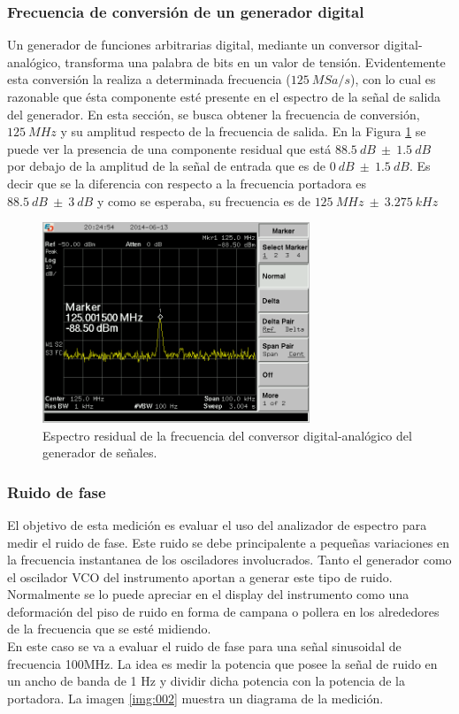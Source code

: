 \documentclass[a4paper,10pt]{article}
\begin{document}
		\subsubsection{Frecuencia de conversi\'on de un generador digital}
		\indent Un generador de funciones arbitrarias digital, mediante un 
		conversor digital-anal\'ogico, transforma una palabra de bits en un 
		valor de tensi\'on. Evidentemente esta conversi\'on la realiza a 
		determinada frecuencia ($125~MSa/s$), con lo cual es razonable que 
		\'esta componente est\'e presente en el espectro de la se\~nal de salida
		del generador. En esta secci\'on, se busca obtener la frecuencia de 
		conversi\'on, $125~MHz$ y su amplitud respecto de la frecuencia de 
		salida. En la Figura \ref{freqres} se puede ver la presencia de una 
		componente residual que est\'a $88.5~dB~\pm~1.5~dB$ por debajo de la 
		amplitud de la se\~nal de entrada que es de $0~dB~\pm~1.5~dB$. Es decir 
		que se la diferencia con respecto a la frecuencia portadora es 
		$88.5~dB~\pm~3~dB$ y como se esperaba, su frecuencia es de 
		$125~MHz~\pm~3.275~kHz$
		
		\begin{figure}[!htb]
				\centering
				\includegraphics[width=8cm]
				{Imagenes/SCREN448.png}
				\caption{Espectro residual de la frecuencia del conversor 
				digital-anal\'ogico del generador de se\~nales.}
				\label{freqres} 
		\end{figure}
		
		\subsubsection{Ruido de fase}
		\indent El objetivo de esta medici\'on es evaluar el uso del analizador 
		de espectro para medir el ruido de fase. Este ruido se debe 
		principalente a peque\~nas variaciones en la frecuencia instantanea de 
		los osciladores involucrados. Tanto el generador como el oscilador VCO 
		del instrumento aportan a generar este tipo de ruido. \\
		\indent Normalmente se lo puede apreciar en el display del instrumento 
		como una deformaci\'on del piso de ruido en forma de campana o pollera 
		en los alrededores de la frecuencia que se est\'e midiendo. \\
		\indent En este caso se va a evaluar el ruido de fase para una se\~nal
		sinusoidal de frecuencia 100MHz. La idea es medir la potencia que posee 
		la se\~nal de ruido en un ancho de banda de 1 Hz y dividir dicha 
		potencia con la potencia de la portadora. La imagen \ref{img:002} 
		muestra un diagrama de la medici\'on. 
\end{document}
